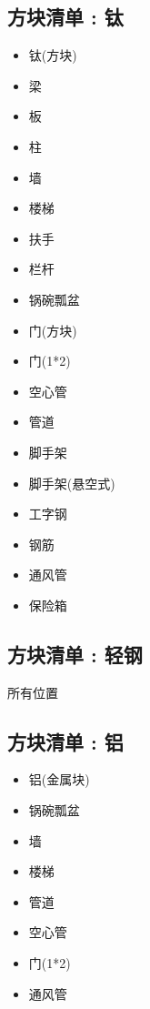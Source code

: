 {  \subsection{方块清单 : 钛}{
      \begin{itemize}
          \item 钛(方块)
          \item 梁
          \item 板
          \item 柱
          \item 墙
          \item 楼梯
          \item 扶手
          \item 栏杆
          \item 锅碗瓢盆
          \item 门(方块)
          \item 门(1*2)
          \item 空心管
          \item 管道
          \item 脚手架
          \item 脚手架(悬空式)
          \item 工字钢
          \item 钢筋
          \item 通风管
          \item 保险箱
      \end{itemize}
  }

  \subsection{方块清单 : 轻钢}{
      所有位置
  }

  \subsection{方块清单 : 铝}{
      \begin{itemize}
          \item 铝(金属块)
          \item 锅碗瓢盆
          \item 墙
          \item 楼梯
          \item 管道
          \item 空心管
          \item 门(1*2)
          \item 通风管
      \end{itemize}
  }

}
